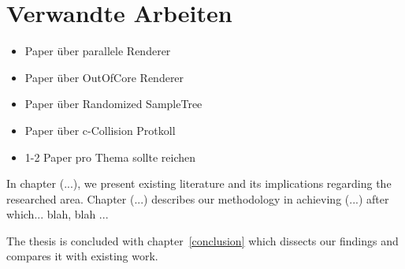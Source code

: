 \chapter{Verwandte Arbeiten}
\label{relatedwork}

\begin{itemize}
 \item Paper über parallele Renderer
 \item Paper über OutOfCore Renderer
 \item Paper über Randomized SampleTree
 \item Paper über c-Collision Protkoll
 \item 1-2 Paper pro Thema sollte reichen
\end{itemize}

In chapter (...), we present existing literature and its implications regarding
the researched area. Chapter (...) describes our methodology in achieving (...)
after which... blah, blah ...

The thesis is concluded with chapter~\ref{conclusion} which dissects our
findings and compares it with existing work.


